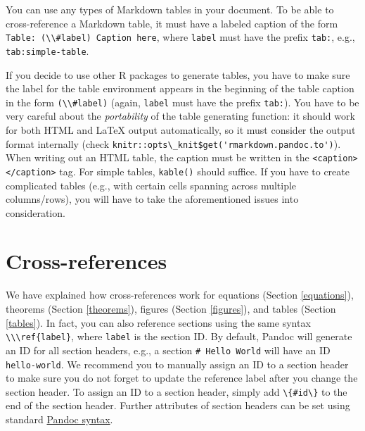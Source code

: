 \documentclass[doctor,openright,twoside]{sjtuthesis}
\newcommand{\passthrough}[1]{#1}
\theoremstyle{plain}
\theoremstyle{definition}
\theoremstyle{remark}
\theoremstyle{ocrenumbox}
\theoremstyle{plain}
\begin{document}
You can use any types of Markdown tables in your document. To be able to
cross-reference a Markdown table, it must have a labeled caption of the
form \passthrough{\lstinline!Table: (\\#label) Caption here!}, where
\passthrough{\lstinline!label!} must have the prefix
\passthrough{\lstinline!tab:!}, e.g.,
\passthrough{\lstinline!tab:simple-table!}.

If you decide to use other R packages to generate tables, you have to
make sure the label for the table environment appears in the beginning
of the table caption in the form \passthrough{\lstinline!(\\#label)!}
(again, \passthrough{\lstinline!label!} must have the prefix
\passthrough{\lstinline!tab:!}). You have to be very careful about the
\emph{portability} of the table generating function: it should work for
both HTML and LaTeX output automatically, so it must consider the output
format internally (check
\passthrough{\lstinline!knitr::opts\_knit$get('rmarkdown.pandoc.to')!}).
When writing out an HTML table, the caption must be written in the
\passthrough{\lstinline!<caption></caption>!} tag. For simple tables,
\passthrough{\lstinline!kable()!} should suffice. If you have to create
complicated tables (e.g., with certain cells spanning across multiple
columns/rows), you will have to take the aforementioned issues into
consideration.

\hypertarget{cross-references}{%
\section{Cross-references}\label{cross-references}}

We have explained how cross-references work for
equations (Section \ref{equations}), theorems (Section \ref{theorems}),
figures (Section \ref{figures}), and tables (Section \ref{tables}). In
fact, you can also reference sections using the same syntax
\passthrough{\lstinline!\\\ref{label}!}, where
\passthrough{\lstinline!label!} is the section ID. By default, Pandoc
will generate an ID for all section headers, e.g., a section
\passthrough{\lstinline!# Hello World!} will have an ID
\passthrough{\lstinline!hello-world!}. We recommend you to manually
assign an ID to a section header to make sure you do not forget to
update the reference label after you change the section header. To
assign an ID to a section header, simply add
\passthrough{\lstinline!\{#id\}!} to the end of the section header.
Further attributes of section headers can be set using standard
\href{http://pandoc.org/MANUAL.html\#header-identifiers}{Pandoc syntax}.
\end{document}
